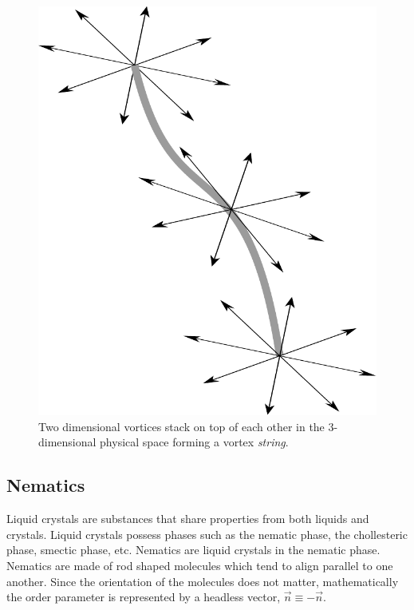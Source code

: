 \begin{figure}
	\centering
	\includegraphics[scale=0.7]{./figures/string.pdf}
	\caption{Two dimensional vortices stack on top of each other in the 3-dimensional physical space forming a vortex \textit{string}.}
	\label{fig:string}
\end{figure}
\subsection{Nematics}\label{sec:nematics}
Liquid crystals are substances that share properties from both liquids and crystals. Liquid crystals possess phases such as the nematic phase, the chollesteric phase, smectic phase, etc. Nematics are liquid crystals in the nematic phase. Nematics are made of rod shaped molecules which tend to align parallel to one another. Since the orientation of the molecules does not matter, mathematically the order parameter is represented by a headless vector, $\vec{n} \equiv -\vec{n}$.


